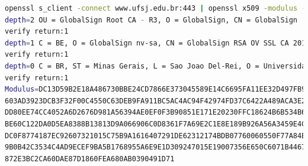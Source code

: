 \begin{frame}
\framebreak

\begin{lstlisting}[language=bash, label=lst-ufsj-key-hex, caption={Visualizando a chave pública da UFSJ em hex.}, postbreak=\mbox{$\hookrightarrow$\space}, basicstyle=\fontsize{8}{10}\selectfont\ttfamily]
openssl s_client -connect www.ufsj.edu.br:443 | openssl x509 -modulus -noout 
depth=2 OU = GlobalSign Root CA - R3, O = GlobalSign, CN = GlobalSign
verify return:1
depth=1 C = BE, O = GlobalSign nv-sa, CN = GlobalSign RSA OV SSL CA 2018
verify return:1
depth=0 C = BR, ST = Minas Gerais, L = Sao Joao Del-Rei, O = Universidade Federal de Sao Joao Del-Rei - UFSJ, CN = ufsj.edu.br
verify return:1
Modulus=DC13D59B2E18A486730BBE24CD7866E373045589E14C6695FA11EE32D497FB9D116AF6ED
603AD3923DCB3F32F00C4550C63DEB9FA911BC5AC4AC94F42974FD37C6422A489ACA3E2A44FF589A
DD80EE74CC4052A6D2676D981A56394AE0EF0F3B90851E171E20230FFC18624B6B534B6C6E3F6BAA
BE60C122DA0D5EA8388B13813D9A066906C0D8361F7A69E2C1E8E189B926A56A3459E4C08487660A
DC0F8774187EC92607321015C75B9A1616407291DE62312174BDB07760060550F77A84E4EFA94773
9B0B42C3534C4AD9ECEF9BA5B1768955A6E9E1D309247015E19007356E650C6071B4467A732E3A07
872E3BC2CA60DAE87D1860FEA680AB0390491D71
\end{lstlisting}

\end{frame}




